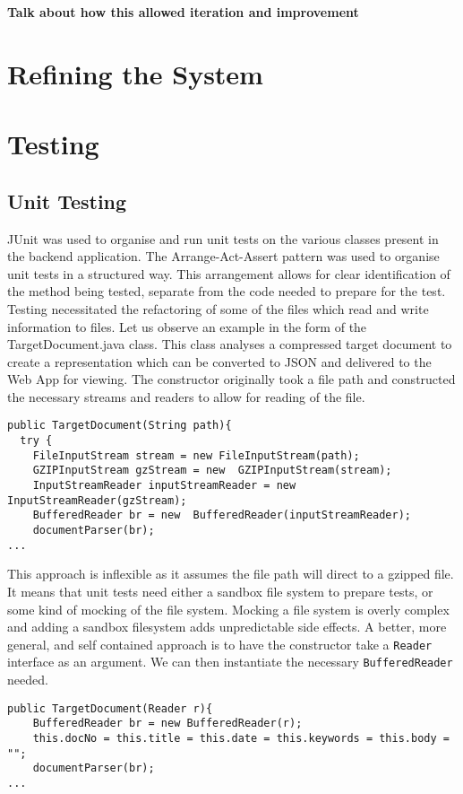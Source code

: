 \documentclass{l4proj}
\newcommand{\code}[1]{\texttt{#1}}
\begin{document}
\textbf{Talk about how this allowed iteration and improvement}

\section{Refining the System}
\section{Testing}
\subsection{Unit Testing}
JUnit was used to organise and run unit tests on the various classes present in the backend application.
The Arrange-Act-Assert pattern was used to organise unit tests in a structured way. This arrangement allows for clear identification of the method being tested, separate from the code needed to prepare for the test.
Testing necessitated the refactoring of some of the files which read and write information to files. Let us observe an example in the form of the TargetDocument.java class. This class analyses a compressed target document to create a representation which can be converted to JSON and delivered to the Web App for viewing.
The constructor originally took a file path and constructed the necessary streams and readers to allow for reading of the file.
\begin{verbatim}
public TargetDocument(String path){
  try {
    FileInputStream stream = new FileInputStream(path);
    GZIPInputStream gzStream = new  GZIPInputStream(stream);
    InputStreamReader inputStreamReader = new  InputStreamReader(gzStream);
    BufferedReader br = new  BufferedReader(inputStreamReader);
    documentParser(br);
...
\end{verbatim}

This approach is inflexible as it assumes the file path will direct to a gzipped file. It means that unit tests need either a sandbox file system to prepare tests, or some kind of mocking of the file system. Mocking a file system is overly complex and adding a sandbox filesystem adds unpredictable side effects.
A better, more general, and self contained approach is to have the constructor take a \code{Reader} interface as an argument. We can then instantiate the necessary \code{BufferedReader} needed.

\begin{verbatim}
public TargetDocument(Reader r){
    BufferedReader br = new BufferedReader(r);
    this.docNo = this.title = this.date = this.keywords = this.body = "";
    documentParser(br);
...
\end{verbatim}
\end{document}
